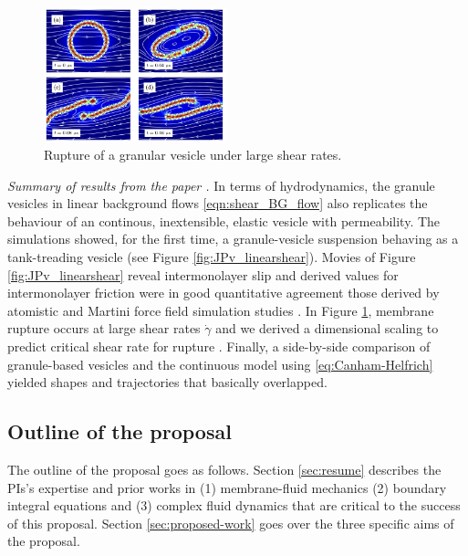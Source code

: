 \begin{figure}
\includegraphics[width=0.475\textwidth]{figures/PreliminaryWork/Rupture.jpg}
\caption{\label{fig:JPv_rupture}Rupture of a granular vesicle under large shear rates.}
\end{figure}
\textit{Summary of results from the paper \cite{FuQuRyYo22}.}
In terms of hydrodynamics, the granule vesicles in linear
background flows \eqref{eqn:shear_BG_flow} also replicates
the behaviour of an continous, inextensible,
elastic vesicle with permeability.
The simulations showed, for the first time,
a granule-vesicle suspension behaving
as a tank-treading vesicle \cite{Finken2008, Shaqfeh11}
(see Figure \ref{fig:JPv_linearshear}).
Movies of Figure \ref{fig:JPv_linearshear} reveal
intermonolayer slip and derived values for intermonolayer
friction were in good quantitative agreement 
those derived by atomistic and Martini force field
simulation studies \cite{WuoEd06, denOtter2007, SHKULIPA2005823, Zgorski2019}.
In Figure \ref{fig:JPv_rupture},
membrane rupture occurs at large shear rates $\dot \gamma$
and we derived a dimensional scaling to 
predict critical shear rate for rupture
\cite{VLAHOVSKA2009775,keller_skalak_1982}.
Finally, a side-by-side comparison
of granule-based vesicles and the continuous model using
\eqref{eq:Canham-Helfrich} yielded shapes and trajectories that
basically overlapped.


\subsection{Outline of the proposal}
The outline of the proposal goes as follows.
Section \ref{sec:resume} describes the
PIs's expertise and prior works
in (1) membrane-fluid mechanics (2) boundary integral equations
and (3) complex fluid dynamics
that are critical to the success of this proposal. 
Section \ref{sec:proposed-work}
goes over the three specific aims of the proposal.

